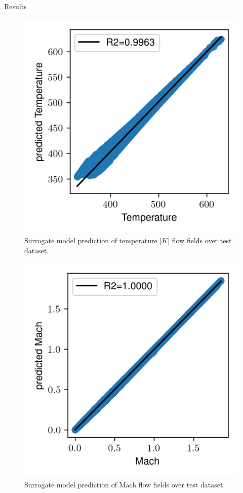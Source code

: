 \begin{frame}{Results}
\begin{figure}
\hypertarget{fig:r2_temperature}{%
\centering
\includegraphics{figures/results/Temperature.png}
\caption{Surrogate model prediction of temperature {[}\(K\){]} flow
fields over test dataset.}\label{fig:r2_temperature}
}
\end{figure}

\begin{figure}
\hypertarget{fig:r2_mach}{%
\centering
\includegraphics{figures/results/Mach.png}
\caption{Surrogate model prediction of Mach flow fields over test
dataset.}\label{fig:r2_mach}
}
\end{figure}


\end{frame}
